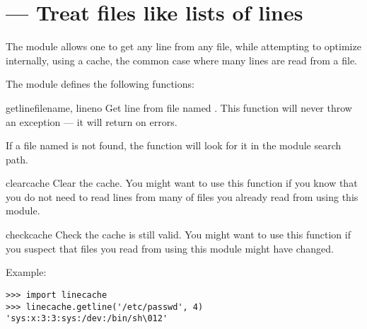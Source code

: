 \section{ ---
         Treat files like lists of lines}



The  module allows one to get any line from any file,
while attempting to optimize internally, using a cache, the common case
where many lines are read from a file.

The  module defines the following functions:

\begin{funcdesc}{getline}{filename, lineno}
Get line  from file named . This function
will never throw an exception --- it will return  on errors.

If a file named  is not found, the function will look
for it in the module search path.
\end{funcdesc}

\begin{funcdesc}{clearcache}{}
Clear the cache. You might want to use this function if you know that
you do not need to read lines from many of files you already read from
using this module.
\end{funcdesc}

\begin{funcdesc}{checkcache}{}
Check the cache is still valid. You might want to use this function if
you suspect that files you read from using this module might have
changed.
\end{funcdesc}

Example:

\begin{verbatim}
>>> import linecache
>>> linecache.getline('/etc/passwd', 4)
'sys:x:3:3:sys:/dev:/bin/sh\012'
\end{verbatim}
